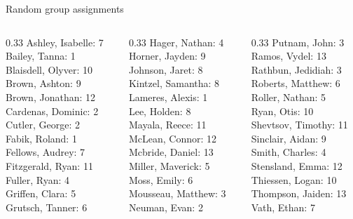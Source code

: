 \documentclass[10pt]{beamer}
\begin{document}
\begin{frame}{Random group assignments}
\begin{columns}
\begin{column}{0.33\textwidth}
Ashley, Isabelle: 7 \\ 
Bailey, Tanna: 1 \\ 
Blaisdell, Olyver: 10 \\ 
Brown, Ashton: 9 \\ 
Brown, Jonathan: 12 \\ 
Cardenas, Dominic: 2 \\ 
Cutler, George: 2 \\ 
Fabik, Roland: 1 \\ 
Fellows, Audrey: 7 \\ 
Fitzgerald, Ryan: 11 \\ 
Fuller, Ryan: 4 \\ 
Griffen, Clara: 5 \\ 
Grutsch, Tanner: 6 \\\end{column}
\begin{column}{0.33\textwidth}
Hager, Nathan: 4 \\ 
Horner, Jayden: 9 \\ 
Johnson, Jaret: 8 \\ 
Kintzel, Samantha: 8 \\ 
Lameres, Alexis: 1 \\ 
Lee, Holden: 8 \\ 
Mayala, Reece: 11 \\ 
McLean, Connor: 12 \\ 
Mcbride, Daniel: 13 \\ 
Miller, Maverick: 5 \\ 
Moss, Emily: 6 \\ 
Mousseau, Matthew: 3 \\ 
Neuman, Evan: 2 \\\end{column}
\begin{column}{0.33\textwidth}
Putnam, John: 3 \\ 
Ramos, Vydel: 13 \\ 
Rathbun, Jedidiah: 3 \\ 
Roberts, Matthew: 6 \\ 
Roller, Nathan: 5 \\ 
Ryan, Otis: 10 \\ 
Shevtsov, Timothy: 11 \\ 
Sinclair, Aidan: 9 \\ 
Smith, Charles: 4 \\ 
Stensland, Emma: 12 \\ 
Thiessen, Logan: 10 \\ 
Thompson, Jaiden: 13 \\ 
Vath, Ethan: 7 \\\end{column}
\end{columns}
\end{frame}
\end{document}
